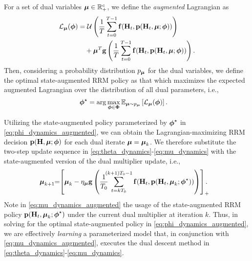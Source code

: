 \documentclass[lettersize,journal]{IEEEtran}
\def\E{\mathbb{E}}
\newcommand{\nn}[1]{{\textcolor{red}{[\textit{Navid: #1}]}}}
\begin{document}
For a set of dual variables $\boldsymbol{\mu} \in {\mathbb R}_+^c$, we define the \emph{augmented} Lagrangian as
\begin{align}
{\ensuremath{\mathcal L}}_{\boldsymbol{\mu}}(\boldsymbol{\phi}) &= \mathcal{U}\left( \frac{1}{T} \sum_{t=0}^{T-1} {\mathbf f}({\mathbf H}_t, {\mathbf p}({\mathbf H}_t, \boldsymbol{\mu};\boldsymbol{\phi})) \right) \nonumber \\
&\quad+ \boldsymbol{\mu}^T {\mathbf g}\left( \frac{1}{T} \sum_{t=0}^{T-1} {\mathbf f}({\mathbf H}_t, {\mathbf p}({\mathbf H}_t, \boldsymbol{\mu};\boldsymbol{\phi})) \right).\label{eq:augmented_Lagrangian}
\end{align}
Then, considering a probability distribution $p_{\boldsymbol{\mu}}$ for the dual variables, we define the optimal state-augmented RRM policy as that which maximizes the expected augmented Lagrangian over the distribution of all dual parameters, i.e., 
\begin{align}
\bbphi^{\star} &= \arg \max_{\bbphi \in \bbPhi} \E_{\bbmu \sim p_{\bbmu}}\left[ \ccalL_{\bbmu}(\bbphi) \right]. \label{eq:phi_dynamics_augmented}
\end{align}

Utilizing the state-augmented policy parameterized by $\boldsymbol{\phi}^{\star}$ in \eqref{eq:phi_dynamics_augmented}, we can obtain the Lagrangian-maximizing RRM decision ${\mathbf p}({\mathbf H}, \boldsymbol{\mu}; \boldsymbol{\phi})$ for each dual iterate $\boldsymbol{\mu} = \boldsymbol{\mu}_{k}$. We therefore substitute the two-step update sequence in \eqref{eq:theta_dynamics}-\eqref{eq:mu_dynamics} with the state-augmented version of the dual multiplier update, i.e., %
\begin{align}
\boldsymbol{\mu}_{k+1} \hspace{-3pt} &= \hspace{-3pt} \left[\boldsymbol{\mu}_k - \eta_{\boldsymbol{\mu}} {\mathbf g}\left( \frac{1}{T_0} \hspace{-6pt} \sum_{t=kT_0}^{(k+1)T_0-1} {\mathbf f}({\mathbf H}_{t}, {\mathbf p}({\mathbf H}_{t},\boldsymbol{\mu}_k;\boldsymbol{\phi}^{\star})) \right)\right]_+\hspace{-7pt}.\label{eq:mu_dynamics_augmented}
\end{align}
Note in \eqref{eq:mu_dynamics_augmented} the usage of the state-augmented RRM policy ${\mathbf p}({\mathbf H}_{t},\boldsymbol{\mu}_k;\boldsymbol{\phi}^{\star})$ under the current dual multiplier at iteration $k$. Thus, in solving for the optimal state-augmented policy in \eqref{eq:phi_dynamics_augmented}, we are effectively \emph{learning} a parameterized model that, in conjunction with \eqref{eq:mu_dynamics_augmented}, executes the dual descent method in \eqref{eq:theta_dynamics}-\eqref{eq:mu_dynamics}.
\end{document}
